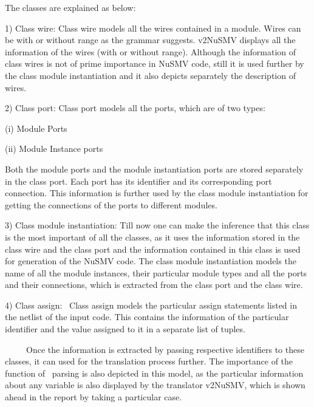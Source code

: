 \documentclass[a4paper]{article}
\begin{document}
{\color[rgb]{0.0,0.0,0.039215688}
\textrm{The classes are explained as below:\ }}

{\color[rgb]{0.0,0.0,0.039215688}
\textrm{1) Class wire: Class wire models all the wires contained in a
module. Wires can be with or without range as the grammar suggests.
v2NuSMV displays all the information of the wires (with or without
range). Although the information of class wires is not of prime
importance in NuSMV code, still it is used further by the class module
instantiation and it also depicts separately the description of
wires.\ }}

{\color[rgb]{0.0,0.0,0.039215688}
\textrm{2) Class port: Class port models all the ports, which are of two
types:}}

{\color[rgb]{0.0,0.0,0.039215688}
\textrm{(i) Module Ports}}

{\color[rgb]{0.0,0.0,0.039215688}
\textrm{(ii) Module Instance ports\ }}

{\color[rgb]{0.0,0.0,0.039215688}
\textrm{Both the module ports and the module instantiation ports are
stored separately in the class port. Each port has its identifier and
its corresponding port connection. This information is further used by
the class module instantiation for getting the connections of the ports
to different modules.\ }}

{\color[rgb]{0.0,0.0,0.039215688}
\textrm{3) Class module instantiation: Till now one can make the
inference that this class is the most important of all the classes, as
it uses the information stored in the class wire and the class port and
the information contained in this class is used for generation of the
NuSMV code. The class module instantiation models the name of all the
module instances, their particular module types and all the ports and
their connections, which is extracted from the class port and the class
wire.}}

{\color[rgb]{0.0,0.0,0.039215688}
\textrm{4) Class assign: \ Class assign models the particular assign
statements listed in the netlist of the input code. This contains the
information of the particular identifier and the value assigned to it
in a separate list of tuples.\ }}

{\color[rgb]{0.0,0.0,0.039215688}
\textrm{\ \ }\textrm{\ \ \ Once the information is extracted by passing
respective identifiers to these classes, it can used for the
translation process further. The importance of the function of
\ parsing is also depicted in this model, as the particular information
about any variable is also displayed by the translator v2NuSMV, which
is shown ahead in the report by taking a particular case.\ }}
\end{document}
